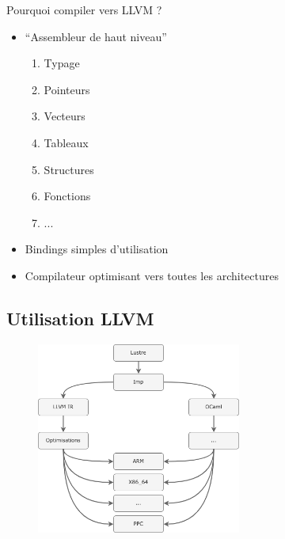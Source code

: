 \documentclass{beamer} %
\begin{document}
\begin{frame}{Pourquoi compiler vers LLVM ?}
    \vfill
    \begin{itemize}
        \item “Assembleur de haut niveau”
        \begin{enumerate}
            \item Typage
            \item Pointeurs
            \item Vecteurs
            \item Tableaux
            \item Structures
            \item Fonctions
            \item ...
        \end{enumerate}
    \vfill \item Bindings simples d'utilisation
    \vfill \item Compilateur optimisant vers toutes les architectures
    \end{itemize}
    \vfill
\end{frame}

\subsection{Utilisation LLVM}

\begin{frame}
    \begin{figure}
        \centering
        \includegraphics[width=0.6\textwidth]{imgs/compilation.png}
    \end{figure}
\end{frame}
\end{document}
